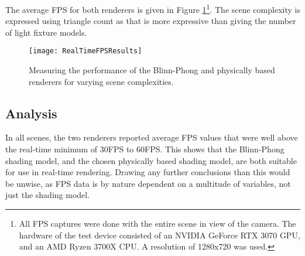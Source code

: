 The average FPS for both renderers is given in Figure \ref{fig:RealTimeFPSResults}\footnote{All FPS captures were done with the entire scene in view of the camera. The hardware of the test device consisted of an NVIDIA GeForce RTX 3070 GPU, and an AMD Ryzen 3700X CPU. A resolution of 1280x720 was used.}. The scene complexity is expressed using triangle count as that is more expressive than giving the number of light fixture models.

\begin{figure}[h]
	\centering
	\texttt{[image: RealTimeFPSResults]}
	\caption{Measuring the performance of the Blinn-Phong and physically based renderers for varying scene complexities.}
	\label{fig:RealTimeFPSResults}
\end{figure}

\vspace{-0.3cm}

\subsection{Analysis}

In all scenes, the two renderers reported average FPS values that were well above the real-time minimum of 30FPS to 60FPS. This shows that the Blinn-Phong shading model, and the chosen physically based shading model, are both suitable for use in real-time rendering. Drawing any further conclusions than this would be unwise, as FPS data is by nature dependent on a multitude of variables, not just the shading model.
